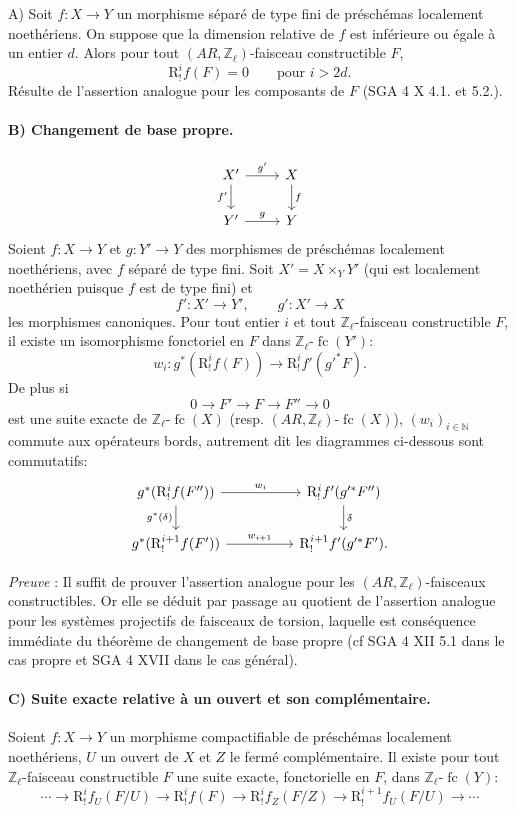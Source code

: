 \documentclass[11pt]{article}
\providecommand{\fc}{\operatorname{fc}}
\begin{document}
A) Soit \(f:X\to Y\) un morphisme séparé de type fini de préschémas localement noethériens. On suppose que la dimension relative de \(f\) est inférieure ou égale à un entier \(d\). Alors pour tout \((AR,\mathbb Z_\ell)\)-faisceau constructible \(F\),
\[
\mathrm{R}^i_!f(F)=0\qquad\text{pour }i>2d.
\]
Résulte de l'assertion analogue pour les composants de \(F\) (SGA 4 X 4.1. et 5.2.).

\paragraph{B) Changement de base propre.}
\[
\begin{tikzcd}
X' \arrow[r,"g'"] \arrow[d,"f'"'] & X \arrow[d,"f"]\\
Y' \arrow[r,"g"] & Y
\end{tikzcd}
\]
Soient \(f:X\to Y\) et \(g:Y'\to Y\) des morphismes de préschémas localement noethériens, avec \(f\) séparé de type fini. Soit \(X'=X\times_Y Y'\) (qui est localement noethérien puisque \(f\) est de type fini) et
\[
f':X'\to Y',\qquad g':X'\to X
\]
les morphismes canoniques. Pour tout entier \(i\) et tout \(\mathbb Z_\ell\)-faisceau constructible \(F\), il existe un isomorphisme fonctoriel en \(F\) dans \(\mathbb Z_\ell\text{-}\fc(Y')\):
\[
w_i:g^*(\mathrm{R}^i_!f(F))\longrightarrow \mathrm{R}^i_!f'(g'^*F).
\]
De
plus si
\[
0\longrightarrow F'\longrightarrow F\longrightarrow F''\longrightarrow 0
\]
est une suite exacte de \(\mathbb Z_\ell\text{-}\fc(X)\) (resp. \((AR,\mathbb Z_\ell)\text{-}\fc(X)\)), \((w_i)_{i\in\mathbb N}\) commute aux opérateurs bords, autrement dit les diagrammes ci-dessous sont commutatifs:
\[
\begin{tikzcd}[column sep=huge]
g^*(\mathrm{R}^i_!f(F'')) \arrow[r,"w_i"] \arrow[d,"g^*(\delta)"']
&
\mathrm{R}^i_!f'(g'^*F'') \arrow[d,"\delta"]\\
g^*(\mathrm{R}^{i+1}_!f(F')) \arrow[r,"w_{i+1}"]
&
\mathrm{R}^{i+1}_!f'(g'^*F').
\end{tikzcd}
\]

\emph{Preuve} : Il suffit de prouver l'assertion analogue pour les \((AR,\mathbb Z_\ell)\)-faisceaux constructibles. Or elle se déduit par passage au quotient de l'assertion analogue pour les systèmes projectifs de faisceaux de torsion, laquelle est conséquence immédiate du théorème de changement de base propre (cf SGA 4 XII 5.1 dans le cas propre et SGA 4 XVII dans le cas général).

\paragraph{C) Suite exacte relative à un ouvert et son complémentaire.}
Soient \(f:X\to Y\) un morphisme compactifiable de préschémas localement noethériens, \(U\) un ouvert de \(X\) et \(Z\) le fermé complémentaire. Il existe pour tout \(\mathbb Z_\ell\)-faisceau constructible \(F\) une suite exacte, fonctorielle en \(F\), dans \(\mathbb Z_\ell\text{-}\fc(Y)\):
\[
\cdots\longrightarrow \mathrm{R}^i_!f_U(F/U)
\longrightarrow \mathrm{R}^i_!f(F)
\longrightarrow \mathrm{R}^i_!f_Z(F/Z)
\longrightarrow \mathrm{R}^{i+1}_!f_U(F/U)
\longrightarrow\cdots
\]
\end{document}
